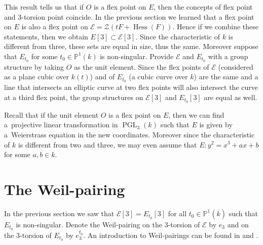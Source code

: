 \documentclass[11pt]{article}
\newcommand{\mpp}{{\mathbb{P}}}
\newcommand{\msetp}[1]{{\left({#1}\right)}}					%
\newcommand{\msets}[1]{{\left[{#1}\right]}}					%
\newcommand{\mac}[1]{{\overline{#1}}}
\newcommand{\mhess}[1]{\operatorname{Hess}\msetp{#1}}			%
\newcommand{\mpgl}[2]{{\operatorname{PGL}_{#1}}\msetp{#2}}	%
\newcommand{\mps}[2]{{\mpp^{#1}\msetp{#2}}}						%
\numberwithin{equation}{section}
\begin{document}
This result tells us that if $O$ is a flex point on $E$, then the concepts of flex point and 3-torsion point coincide. In the previous section we learned that a flex point on $E$ is also a flex point on $\mathcal{E}=\mathcal{Z}(tF+\mhess{F})$. Hence if we combine these statements, then we obtain $E\msets{3}\subset\mathcal{E}\msets{3}$. Since the characteristic of $k$ is different from three, these sets are equal in size, thus the same. Moreover suppose that $E_{t_0}$ for some $t_0\in\mps{1}{k}$ is non-singular. Provide $\mathcal{E}$ and $E_{t_0}$ with a group structure by taking $O$ as the unit element. Since the flex points of $\mathcal{E}$ (considered as a plane cubic over $k(t)$) and of $E_{t_0}$ (a cubic curve over $k$) are the same and a line that intersects an elliptic curve at two flex points will also intersect the curve at a third flex point, the group structures on $\mathcal{E}\msets{3}$ and $E_{t_0}\msets{3}$ are equal as well.

Recall that if the unit element $O$ is a flex point on $E$, then we can find a~projective linear transformation in $\mpgl{3}{k}$ such that $E$ is given by a~Weierstrass equation in the new coordinates. Moreover since the characteristic of $k$ is different from two and three, we may even assume that $E\colon y^2=x^3+ax+b$ for some $a,b\in k$.

\section{The Weil-pairing}\label{hpga:sec:wp}

In the previous section we saw that $\mathcal{E}\msets{3}=E_{t_0}\msets{3}$ for all $t_0\in\mps{1}{\mac{k}}$ such that $E_{t_0}$ is non-singular. Denote the Weil-pairing on the 3-torsion of $\mathcal{E}$ by $e_3$ and on the 3-torsion of $E_{t_0}$ by $e_3^{t_0}$. An introduction to Weil-pairings can be found in \cite[Section~III.8]{silverman1985} and \cite[Sections~3.3 and~11.2]{washington2008}.
\end{document}
